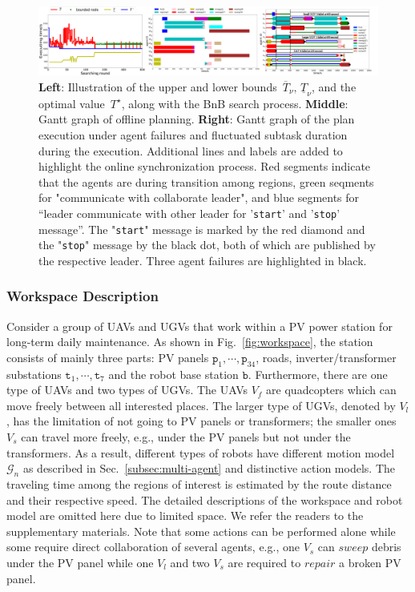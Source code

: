   \begin{figure}
    \centering
        \includegraphics[width=1\textwidth]{figures/simulation/taskfinal/mixed_poset.pdf}
    \caption{\textbf{Left}: Illustration of the upper and lower
bounds~$\overline{T}_\nu,\,\underline{T}_\nu$, and the optimal value~$T^\star$,
along with the BnB search process.
\textbf{Middle}: Gantt graph of offline planning.
\textbf{Right}: Gantt graph of the plan execution under agent failures and fluctuated subtask duration during the execution.
Additional lines and labels are added to highlight the online synchronization process. Red segments indicate that the agents
are during transition among regions, green seqments for "communicate
with collaborate leader", and blue segments for
“leader communicate with other leader for '\texttt{start}' and '\texttt{stop}' message”.
The "\texttt{start}" message is marked by the red diamond and the "\texttt{stop}" message
by the black dot, both of which are published by the respective leader.
Three agent failures are highlighted in black.
    }
\label{fig:task2-bnb}
\end{figure}

\subsubsection{Workspace Description}\label{subsubsec:ws}

Consider a group of UAVs and UGVs that work within a PV power station for
long-term daily maintenance.
As shown in Fig.~\ref{fig:workspace},
the station consists of mainly three parts: PV panels $\texttt{p}_1,\cdots,\texttt{p}_{34}$, roads,
inverter/transformer substations $\texttt{t}_1,\cdots,\texttt{t}_7$ and the robot base station $\texttt{b}$.
Furthermore, there are one type of UAVs and two types of UGVs.
The UAVs $V_f$ are quadcopters which can move freely between all interested places.
The larger type of UGVs, denoted by $V_l$, has the limitation of not going to PV panels or transformers;
the smaller ones $V_s$ can travel more freely, e.g., under the PV panels but not under the transformers.
As a result, different types of robots have different motion
model~$\mathcal{G}_n$ as described in Sec.~\ref{subsec:multi-agent}
and distinctive action models.
The traveling time among the regions of interest is estimated by the route
distance and their respective speed.
The detailed descriptions of the workspace and robot model are omitted here due to limited space.
We refer the readers to the supplementary materials.
Note that some actions can be performed alone while some require direct
collaboration of several agents,
e.g., one $V_s$ can $sweep$ debris under the PV panel while one $V_l$
and two $V_s$ are required to $repair$ a broken PV panel.







